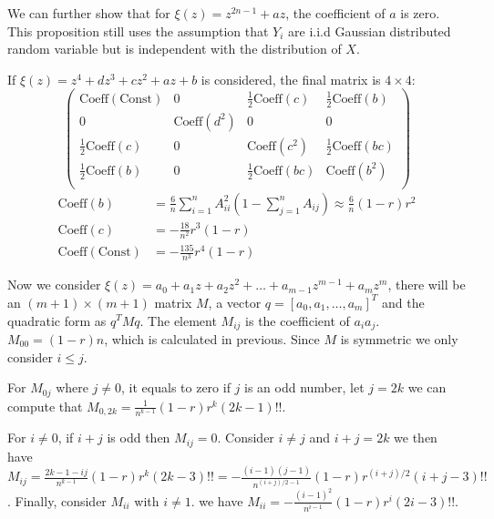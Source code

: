 \documentclass{article}
\begin{document}
We can further show that for $\xi(z) = z^{2n-1} + a z $, the coefficient of $a$ is zero. This proposition still uses the assumption that $Y_i$ are i.i.d Gaussian distributed random variable but is independent with the distribution of $X$.

If $\xi(z) = z^4 + d z^3 + c z^2 + a z + b $ is considered, the final matrix is $4\times 4$:
\begin{equation*}
\begin{pmatrix}
\textrm{Coeff}(\textrm{Const}) & 0 &\frac{1}{2} \textrm{Coeff}(c) & \frac{1}{2}\textrm{Coeff}(b) \\
0 & \textrm{Coeff}(d^2) & 0 & 0\\
\frac{1}{2}\textrm{Coeff}(c) & 0 & \textrm{Coeff}(c^2) & \frac{1}{2}\textrm{Coeff}(bc) \\
\frac{1}{2}\textrm{Coeff}(b) &  0 &\frac{1}{2} \textrm{Coeff}(bc) & \textrm{Coeff}(b^2) \\
\end{pmatrix}
\end{equation*}
\begin{align*}
\textrm{Coeff}(b) & = \frac{6}{n} \sum_{i=1}^n A_{ii}^2 (1 - \sum_{j=1}^n A_{ij}) \approx \frac{6}{n} (1-r)r^2 \\
\textrm{Coeff}(c) & =  -\frac{18}{n^2} r^3(1-r)\\
\textrm{Coeff}(\textrm{Const}) & = -\frac{135}{n^3} r^4(1-r)
\end{align*}

Now we consider $\xi(z) = a_0 + a_1 z + a_2 z^2 + \dots + a_{m-1} z^{m-1} + a_m z^m $, there will be an $(m+1) \times (m+1) $ matrix $M$, a vector  $q = [a_0, a_1, \dots, a_m]^T$ and  the quadratic form as $ q^T M q $. The element $M_{ij}$ is the coefficient of $a_ia_j$. $M_{00} = (1-r) n $, which is calculated in previous. Since $M$ is symmetric we only consider $i\leq j$.

For $M_{0j}$ where $j \neq 0$, it equals to zero if $j$ is an odd number, let $j=2k$ we can compute that $M_{0,2k}=\frac{1}{n^{k-1}} (1-r)r^k (2k-1)!! $. 

For $i \neq 0$, if $i+j$ is odd then $M_{ij} = 0$. Consider $i \neq j$ and $i+j = 2k$ we then have $M_{ij} = \frac{2k-1-ij}{n^{k-1}} (1-r)r^k (2k-3)!! = -\frac{(i-1)(j-1)}{n^{(i+j)/2-1}} (1-r)r^{(i+j)/ 2 } (i+j-3)!!$. Finally, consider $M_{ii}$ with $i \neq 1$. we have $M_{ii} = 
-\frac{(i-1)^2}{n^{i-1}} (1-r)r^i (2i-3)!!$.
\end{document}
